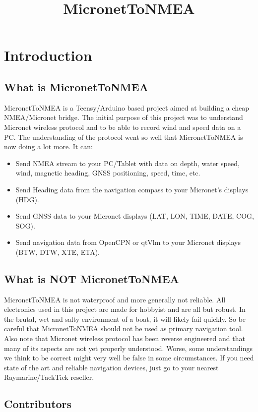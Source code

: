 \documentclass{report}
\begin{document}
\title{MicronetToNMEA}

\chapter {Introduction}

\section{What is MicronetToNMEA}

MicronetToNMEA is a Teensy/Arduino based project aimed at building a cheap NMEA/Micronet bridge. The initial purpose of this project was to understand Micronet wireless protocol and to be able to record wind and speed data on a PC. The understanding of the protocol went so well that MicronetToNMEA is now doing a lot more. It can:

\begin{itemize}
\item Send NMEA stream to your PC/Tablet with data on depth, water speed, wind, magnetic heading, GNSS positioning, speed, time, etc.
\item Send Heading data from the navigation compass to your Micronet's displays (HDG).
\item Send GNSS data to your Micronet displays (LAT, LON, TIME, DATE, COG, SOG).
\item Send navigation data from OpenCPN or qtVlm to your Micronet displays (BTW, DTW, XTE, ETA).
\end{itemize}

\section{What is NOT MicronetToNMEA}

MicronetToNMEA is not waterproof and more generally not reliable. All electronics used in this project are made for hobbyist and are all but robust. In the brutal, wet and salty environment of a boat, it will likely fail quickly. So be careful that MicronetToNMEA should not be used as primary navigation tool. Also note that Micronet wireless protocol has been reverse engineered and that many of its aspects are not yet properly understood. Worse, some understandings we think to be correct might very well be false in some circumstances. If you need state of the art and reliable navigation devices, just go to your nearest Raymarine/TackTick reseller.

\section{Contributors}
\end{document}
